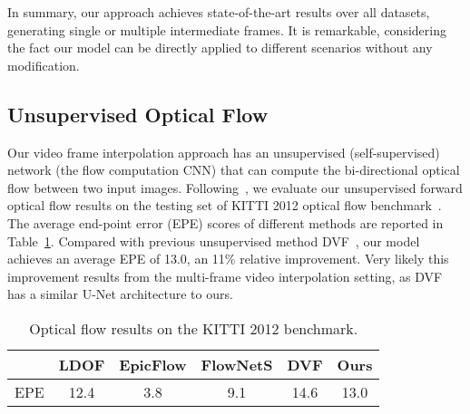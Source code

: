\documentclass[10pt,twocolumn,letterpaper]{article}
\begin{document}
In summary, our approach achieves state-of-the-art results over all datasets, generating single or multiple intermediate frames. It is remarkable, considering the fact our model can be directly applied to different scenarios without any modification. 

\subsection{Unsupervised Optical Flow}
Our video frame interpolation approach has an unsupervised (self-supervised) network (the flow computation CNN) that can compute the bi-directional optical flow between two input images. Following~\cite{liu17video}, we evaluate our unsupervised forward optical flow results on the testing set of KITTI 2012 optical flow benchmark~\cite{Geiger:2012:KITTI}. The average end-point error (EPE) scores of different methods are reported in Table~\ref{tab:optical_flow_kitti_2012}. Compared with previous unsupervised method DVF~\cite{liu17video}, our model achieves an average EPE of 13.0, an 11\% relative improvement. Very likely this improvement results from the multi-frame video interpolation setting, as DVF~\cite{liu17video} has a similar U-Net architecture to ours.


\begin{table}
\centering
\setlength{\belowcaptionskip}{-10pt}
\renewcommand{\tabcolsep}{3.5pt}
\caption{Optical flow results on the KITTI 2012 benchmark. 
}
\label{tab:optical_flow_kitti_2012}
\begin{tabular}{cccccc}
\hline
 & {\small LDOF\cite{Brox:LDOF:2011}} & {\small EpicFlow\cite{EpicFlow}} & {\small FlowNetS\cite{Dosovitskiy:2015Flownet}} & {\small DVF\cite{liu17video}} & {\small Ours} \\
\hline
EPE & 12.4 & 3.8 &  9.1 & 14.6 & 13.0 \\
\hline
\end{tabular}
\end{table}
\end{document}
